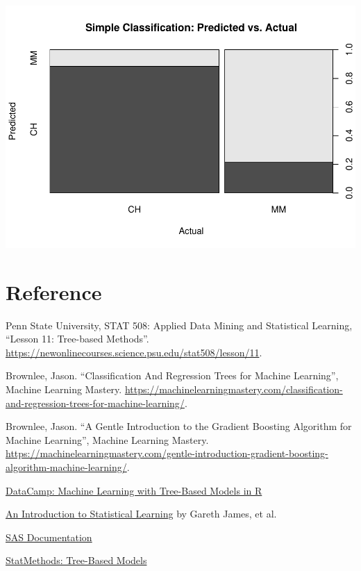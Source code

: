 \documentclass[]{book}
\begin{document}
\includegraphics{data-sci_files/figure-latex/unnamed-chunk-90-1.pdf}

\hypertarget{reference}{%
\chapter{Reference}\label{reference}}

Penn State University, STAT 508: Applied Data Mining and Statistical Learning, ``Lesson 11: Tree-based Methods''. \url{https://newonlinecourses.science.psu.edu/stat508/lesson/11}.

Brownlee, Jason. ``Classification And Regression Trees for Machine Learning'', Machine Learning Mastery. \url{https://machinelearningmastery.com/classification-and-regression-trees-for-machine-learning/}.

Brownlee, Jason. ``A Gentle Introduction to the Gradient Boosting Algorithm for Machine Learning'', Machine Learning Mastery. \url{https://machinelearningmastery.com/gentle-introduction-gradient-boosting-algorithm-machine-learning/}.

\href{https://campus.datacamp.com/courses/machine-learning-with-tree-based-models-in-r}{DataCamp: Machine Learning with Tree-Based Models in R}

\href{http://faculty.marshall.usc.edu/gareth-james/ISL/}{An Introduction to Statistical Learning} by Gareth James, et al.

\href{http://support.sas.com/documentation/cdl/en/stathpug/68163/HTML/default/viewer.htm\#stathpug_hpsplit_details01.htm}{SAS Documentation}

\href{https://www.statmethods.net/advstats/cart.html}{StatMethods: Tree-Based Models}
\end{document}
